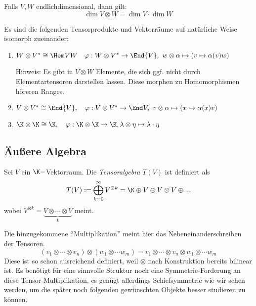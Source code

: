 \documentclass[11pt, a4paper]{article}
\begin{document}
\begin{corollary} Falls $V,W$ endlichdimensional, dann gilt:
$$\dim V\otimes W = \dim V \cdot \dim W $$
\end{corollary}

\begin{example}
Es sind die folgenden Tensorprodukte und Vektorräume auf natürliche Weise isomorph zueinander:

\begin{enumerate}
    \item $W\otimes V^* \cong \Hom V W \quad \varphi: W\otimes V^* \to \End{V}, \ w\otimes \alpha \mapsto (v \mapsto \alpha(v)w)$\par
    Hinweis: Es gibt in $V\otimes W$ Elemente, die sich ggf. nicht durch Elementartensoren darstellen lassen. Diese morphen zu Homomorphismen höreren Ranges.
    \item $V\otimes V^* \cong \End{V}, \quad \varphi: V\otimes V^* \to \End V, \ v\otimes \alpha \mapsto (x\mapsto \alpha(x)v)$ 
    \item $\K \otimes \K \cong \K, \quad \varphi: \K \otimes \K \to \K, \lambda \otimes \eta \mapsto \lambda \cdot \eta$
\end{enumerate}

    
\end{example}
\subsection{Äußere Algebra}

\begin{definition} 
    Sei $V$ ein $\K-$Vektorraum. Die \emph{Tensoralgebra} $T(V)$ ist definiert als
    $$T(V):= \bigoplus _{k = 0}^\infty V^{\otimes k} = \K \oplus V \oplus V\otimes V \oplus...$$
    wobei $V^{\otimes k}= \underbrace{V\otimes \cdots \otimes V}_{k}$ meint.
\end{definition}

\begin{note}
    Die hinzugekommene ``Multiplikation'' meint hier das Nebeneinanderschreiben der Tensoren.
    $$(v_1 \otimes \cdots \otimes v_n) \otimes (w_1 \otimes \cdots w_m) = v_1 \otimes \cdots \otimes v_n \otimes w_1 \otimes \cdots w_m$$
    Diese ist so schon ausreichend definiert, weil $\otimes$ nach Konstruktion bereits bilinear ist. Es benötigt für eine sinnvolle Struktur noch eine Symmetrie-Forderung an diese Tensor-Multiplikation, es genügt allerdings Schiefsymmetrie wie wir sehen werden, um die später noch folgenden gewünschten Objekte besser studieren zu können.
\end{note}
\end{document}
